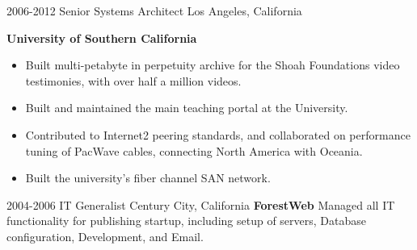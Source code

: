 \begin{entrylist}
{    }
  \entry
    {2006-2012}
    {Senior Systems Architect}
    {Los Angeles, California}
    {
      \textbf{University of Southern California}
      \begin{itemize}
        \item Built multi-petabyte in perpetuity archive for the Shoah Foundations video testimonies, with  over half a million videos. 
        \item Built and maintained the main teaching portal at the University.
        \item Contributed to Internet2 peering standards, and collaborated on performance tuning of PacWave cables, connecting North America with Oceania.
        \item Built the university's fiber channel SAN network.
      \end{itemize}
    }
  \entry
    {2004-2006}
    {IT Generalist}
    {Century City, California}
    {
      \textbf{ForestWeb}
      \newline
     Managed all IT functionality for publishing startup, including setup of servers, Database configuration, Development, and Email.
    }
\end{entrylist}
